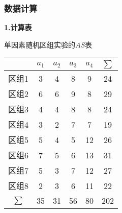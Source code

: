 \subsubsection{数据计算}

\textbf{1.计算表}
\begin{margintable}
	\centering
	\caption{单因素随机区组实验的$AS$表}
	{
		\begin{tabular}{ccccc|c}
			\toprule
    			 & $a_1$ &  $a_2$ &  $a_3$ &  $a_4$ & $\sum$ \\
    			     \midrule
                        区组1 & \cellcolor[rgb]{ .949,  .949,  .949}3 & \cellcolor[rgb]{ .949,  .949,  .949}4 & \cellcolor[rgb]{ .949,  .949,  .949}8 & \cellcolor[rgb]{ .949,  .949,  .949}9 & \cellcolor[rgb]{ .988,  .894,  .839}24 \\
                        区组2 & \cellcolor[rgb]{ .949,  .949,  .949}6 & \cellcolor[rgb]{ .949,  .949,  .949}6 & \cellcolor[rgb]{ .949,  .949,  .949}9 & \cellcolor[rgb]{ .949,  .949,  .949}8 & \cellcolor[rgb]{ .988,  .894,  .839}29 \\
                        区组3 & \cellcolor[rgb]{ .949,  .949,  .949}4 & \cellcolor[rgb]{ .949,  .949,  .949}4 & \cellcolor[rgb]{ .949,  .949,  .949}8 & \cellcolor[rgb]{ .949,  .949,  .949}8 & \cellcolor[rgb]{ .988,  .894,  .839}24 \\
                        区组4 & \cellcolor[rgb]{ .949,  .949,  .949}3 & \cellcolor[rgb]{ .949,  .949,  .949}2 & \cellcolor[rgb]{ .949,  .949,  .949}7 & \cellcolor[rgb]{ .949,  .949,  .949}7 & \cellcolor[rgb]{ .988,  .894,  .839}19 \\
                        区组5 & \cellcolor[rgb]{ .949,  .949,  .949}5 & \cellcolor[rgb]{ .949,  .949,  .949}4 & \cellcolor[rgb]{ .949,  .949,  .949}5 & \cellcolor[rgb]{ .949,  .949,  .949}12 & \cellcolor[rgb]{ .988,  .894,  .839}26 \\
                        区组6 & \cellcolor[rgb]{ .949,  .949,  .949}7 & \cellcolor[rgb]{ .949,  .949,  .949}5 & \cellcolor[rgb]{ .949,  .949,  .949}6 & \cellcolor[rgb]{ .949,  .949,  .949}13 & \cellcolor[rgb]{ .988,  .894,  .839}31 \\
                        区组7 & \cellcolor[rgb]{ .949,  .949,  .949}5 & \cellcolor[rgb]{ .949,  .949,  .949}3 & \cellcolor[rgb]{ .949,  .949,  .949}7 & \cellcolor[rgb]{ .949,  .949,  .949}12 & \cellcolor[rgb]{ .988,  .894,  .839}27 \\
                        区组8 & \cellcolor[rgb]{ .949,  .949,  .949}2 & \cellcolor[rgb]{ .949,  .949,  .949}3 & \cellcolor[rgb]{ .949,  .949,  .949}6 & \cellcolor[rgb]{ .949,  .949,  .949}11 & \cellcolor[rgb]{ .988,  .894,  .839}22 \\
                        \midrule
                              $\sum$ & \cellcolor[rgb]{ .886,  .937,  .855}35 & \cellcolor[rgb]{ .886,  .937,  .855}31 & \cellcolor[rgb]{ .886,  .937,  .855}56 & \cellcolor[rgb]{ .886,  .937,  .855}80 & \cellcolor[rgb]{ .867,  .922,  .969}202 \\

			\bottomrule
		\end{tabular}
	}
\end{margintable}
